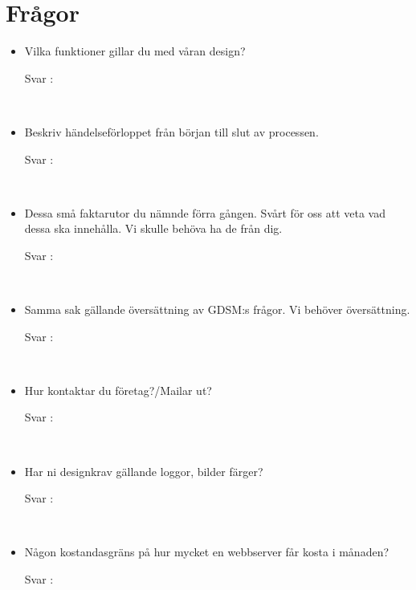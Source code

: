 \documentclass{article}
\date {#1}
\title {
    \documentTitle {Helsingborg Event and Convention Bureau}
    
    \documentDate {}
}
\begin{document}
\maketitle
\thispagestyle{empty}

\newpage




\newpage

\section{Frågor}

 
\begin{itemize}
 \item Vilka funktioner gillar du med våran design?
        \begin{description}
            \item[Svar :]
        \end{description}
    \\
    \item Beskriv händelseförloppet från början till slut av processen.
        \begin{description}
            \item[Svar :]
        \end{description}
    \\
    \item Dessa små faktarutor du nämnde förra gången. Svårt för oss att veta vad dessa ska innehålla. Vi skulle behöva ha de från dig. 
        \begin{description}
            \item[Svar :]
        \end{description}  
    \\
     \item Samma sak gällande översättning av GDSM:s frågor. Vi behöver översättning. 
        \begin{description}
            \item[Svar :]
        \end{description}
    \\
    \item Hur kontaktar du företag?/Mailar ut?
    
        \begin{description}
            \item[Svar :]
        \end{description}
    \\
    \item  Har ni designkrav gällande loggor, bilder färger?
     \begin{description}
            \item[Svar :]
        \end{description}
    \\
    \item Någon kostandasgräns på hur mycket en webbserver får kosta i månaden?
        \begin{description}
            \item[Svar :]
        \end{description}
    \\
\end{itemize}
\end{document}
